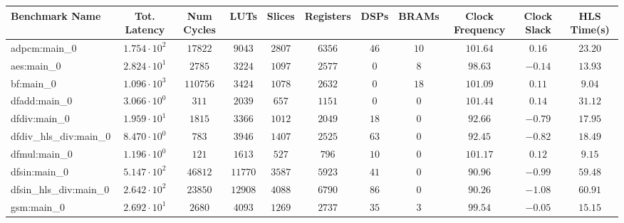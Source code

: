 \begin{tabular}{|l|c|c|c|c|c|c|c|c|c|c|}
\hline
Benchmark Name          & Tot. Latency           & Num Cycles & LUTs      & Slices    & Registers & DSPs    & BRAMs   & Clock Frequency & Clock Slack & HLS Time(s) \\
\hline
adpcm:main\_0           & $ 1.754 \cdot 10^{2} $ & $ 17822  $ & $ 9043  $ & $ 2807  $ & $ 6356  $ & $ 46  $ & $ 10  $ & $ 101.64      $ & $ 0.16    $ & $ 23.20   $ \\
aes:main\_0             & $ 2.824 \cdot 10^{1} $ & $ 2785   $ & $ 3224  $ & $ 1097  $ & $ 2577  $ & $ 0   $ & $ 8   $ & $ 98.63       $ & $ -0.14   $ & $ 13.93   $ \\
bf:main\_0              & $ 1.096 \cdot 10^{3} $ & $ 110756 $ & $ 3424  $ & $ 1078  $ & $ 2632  $ & $ 0   $ & $ 18  $ & $ 101.09      $ & $ 0.11    $ & $ 9.04    $ \\
dfadd:main\_0           & $ 3.066 \cdot 10^{0} $ & $ 311    $ & $ 2039  $ & $ 657   $ & $ 1151  $ & $ 0   $ & $ 0   $ & $ 101.44      $ & $ 0.14    $ & $ 31.12   $ \\
dfdiv:main\_0           & $ 1.959 \cdot 10^{1} $ & $ 1815   $ & $ 3366  $ & $ 1012  $ & $ 2049  $ & $ 18  $ & $ 0   $ & $ 92.66       $ & $ -0.79   $ & $ 17.95   $ \\
dfdiv\_hls\_div:main\_0 & $ 8.470 \cdot 10^{0} $ & $ 783    $ & $ 3946  $ & $ 1407  $ & $ 2525  $ & $ 63  $ & $ 0   $ & $ 92.45       $ & $ -0.82   $ & $ 18.49   $ \\
dfmul:main\_0           & $ 1.196 \cdot 10^{0} $ & $ 121    $ & $ 1613  $ & $ 527   $ & $ 796   $ & $ 10  $ & $ 0   $ & $ 101.17      $ & $ 0.12    $ & $ 9.15    $ \\
dfsin:main\_0           & $ 5.147 \cdot 10^{2} $ & $ 46812  $ & $ 11770 $ & $ 3587  $ & $ 5923  $ & $ 41  $ & $ 0   $ & $ 90.96       $ & $ -0.99   $ & $ 59.48   $ \\
dfsin\_hls\_div:main\_0 & $ 2.642 \cdot 10^{2} $ & $ 23850  $ & $ 12908 $ & $ 4088  $ & $ 6790  $ & $ 86  $ & $ 0   $ & $ 90.26       $ & $ -1.08   $ & $ 60.91   $ \\
gsm:main\_0             & $ 2.692 \cdot 10^{1} $ & $ 2680   $ & $ 4093  $ & $ 1269  $ & $ 2737  $ & $ 35  $ & $ 3   $ & $ 99.54       $ & $ -0.05   $ & $ 15.15   $ \\

\end{tabular}
